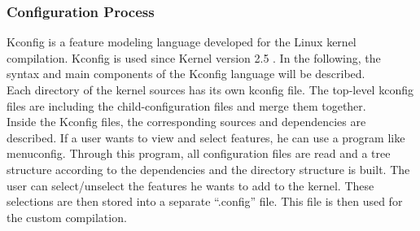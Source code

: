 \documentclass{sig-alternate-05-2015}
\begin{document}
\subsubsection{Configuration Process}
Kconfig is a feature modeling language developed for the Linux kernel compilation. Kconfig is used since Kernel version 2.5 \cite{mauerer2010professional}. In the following, the syntax and main components of the Kconfig language will be described.\\ Each directory of the kernel sources has its own kconfig file. The top-level kconfig files are including the child-configuration files and merge them together.\\ Inside the Kconfig files, the corresponding sources and dependencies are described. If a user wants to view and select features, he can use a program like menuconfig. Through this program, all configuration files are read and a tree structure according to the dependencies and the directory structure is built. The user can select/unselect the features he wants to add to the kernel. These selections are then stored into a separate ``.config'' file. This file is then used for the custom compilation.\par 
\end{document}
